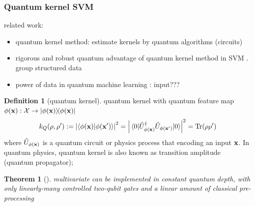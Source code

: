 \documentclass[
10pt,
aps,
pra,
linenumbers,
floatfix,
]{revtex4-2}
\theoremstyle{plain}
\newtheorem{theorem}{Theorem}
\theoremstyle{definition}
\newtheorem{definition}{Definition}
\newcommand{\U}{\hat{U}}
\begin{document}
\subsubsection{Quantum kernel SVM}
related work:
\begin{itemize}
	\item quantum kernel method: estimate kernels by quantum algorithms (circuits)	\cite{havlicekSupervisedLearningQuantum2019}
	\cite{schuldQuantumMachineLearning2019}

	\item rigorous and robust quantum advantage of quantum kernel method in SVM \cite{liuRigorousRobustQuantum2021}. group structured data \cite{glickCovariantQuantumKernels2021}

	\item power of data in quantum machine learning \cite{huangPowerDataQuantum2021}: input???
\end{itemize}
\begin{definition}[quantum kernel]\label{def:quantum_kernel}
	quantum kernel 
	with quantum feature map $\phi(\vb{x}): \mathcal{X}\to \op{\phi(\vb{x})}$
	\begin{equation}
		k_Q(\rho,\rho') := \abs{\ip{\phi(\vbx)}{\phi(\vbx')}}^2 =\abs{\mel{0}{\U_{\phi(\vbx)}^\dagger \U_{\phi(\vbx')} }{0}}^2 = \Tr(\rho\rho')
	\end{equation}
	where $\U_{\phi(\vbx)}$ is a quantum circuit or physics process that encoding an input $\vb{x}$.
	In quantum physics, quantum kernel is also known as transition amplitude (quantum propagator);
\end{definition}
\begin{theorem}[\cite{quekMultivariateTraceEstimation2022}]\label{thm:multivariate_trace}
	multivariate  can be implemented in constant quantum depth, with only linearly-many controlled two-qubit gates and a linear amount of classical pre-processing	
\end{theorem}
\end{document}
